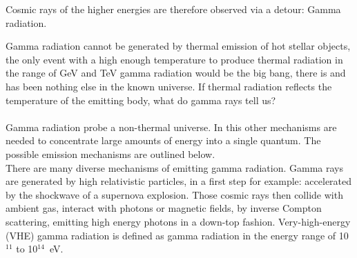 \documentclass[12pt,article,type=msc,colorback,accentcolor=tud9c]{tudthesis}
\begin{document}
Cosmic rays of the higher energies are therefore observed via a detour: Gamma radiation. \\
\begin{wrapfigure}{R}{0.5\textwidth}
\texttt{[image: D:/OwnCloudData/00\_WriteUP/04\_Thesis/Pic/Proposal/Fig/\{Fermi\_image01]}.jpg}
\caption[Fermi LAT]{\label{fig:LAT}FermiLAT Picture from \cite{FermiLAT}}
\end{wrapfigure}



Gamma radiation cannot be generated by thermal emission of hot stellar objects, the only event with a high enough temperature to produce thermal radiation in the range of GeV and TeV gamma radiation would be the big bang, there is and has been nothing else in the known universe. If thermal radiation reflects the temperature of the emitting body, what do gamma rays tell us?\\\\
Gamma radiation probe a non-thermal universe. In this other mechanisms are needed to concentrate large amounts of energy into a single quantum. The possible emission mechanisms are outlined below.\\
There are many diverse mechanisms of emitting gamma radiation. Gamma rays are generated by high relativistic particles, in a first step for example: accelerated by the shockwave of a supernova explosion. Those cosmic rays then collide with ambient gas, interact with photons or magnetic fields, by inverse Compton scattering, emitting high energy photons in a down-top fashion. Very-high-energy (VHE) gamma radiation is defined as gamma radiation in the energy range of 10$^{11}$ to 10$^{14}$~eV.\\
\end{document}
